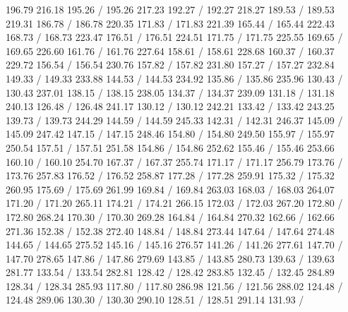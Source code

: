 { 196.79 216.18 195.26 /
 195.26 217.23 192.27 /
 192.27 218.27 189.53 /
 189.53 219.31 186.78 /
 186.78 220.35 171.83 /
 171.83 221.39 165.44 /
 165.44 222.43 168.73 /
 168.73 223.47 176.51 /
 176.51 224.51 171.75 /
 171.75 225.55 169.65 /
 169.65 226.60 161.76 /
 161.76 227.64 158.61 /
 158.61 228.68 160.37 /
 160.37 229.72 156.54 /
 156.54 230.76 157.82 /
 157.82 231.80 157.27 /
 157.27 232.84 149.33 /
 149.33 233.88 144.53 /
 144.53 234.92 135.86 /
 135.86 235.96 130.43 /
 130.43 237.01 138.15 /
 138.15 238.05 134.37 /
 134.37 239.09 131.18 /
 131.18 240.13 126.48 /
 126.48 241.17 130.12 /
 130.12 242.21 133.42 /
 133.42 243.25 139.73 /
 139.73 244.29 144.59 /
 144.59 245.33 142.31 /
 142.31 246.37 145.09 /
 145.09 247.42 147.15 /
 147.15 248.46 154.80 /
 154.80 249.50 155.97 /
 155.97 250.54 157.51 /
 157.51 251.58 154.86 /
 154.86 252.62 155.46 /
 155.46 253.66 160.10 /
 160.10 254.70 167.37 /
 167.37 255.74 171.17 /
 171.17 256.79 173.76 /
 173.76 257.83 176.52 /
 176.52 258.87 177.28 /
 177.28 259.91 175.32 /
 175.32 260.95 175.69 /
 175.69 261.99 169.84 /
 169.84 263.03 168.03 /
 168.03 264.07 171.20 /
 171.20 265.11 174.21 /
 174.21 266.15 172.03 /
 172.03 267.20 172.80 /
 172.80 268.24 170.30 /
 170.30 269.28 164.84 /
 164.84 270.32 162.66 /
 162.66 271.36 152.38 /
 152.38 272.40 148.84 /
 148.84 273.44 147.64 /
 147.64 274.48 144.65 /
 144.65 275.52 145.16 /
 145.16 276.57 141.26 /
 141.26 277.61 147.70 /
 147.70 278.65 147.86 /
 147.86 279.69 143.85 /
 143.85 280.73 139.63 /
 139.63 281.77 133.54 /
 133.54 282.81 128.42 /
 128.42 283.85 132.45 /
 132.45 284.89 128.34 /
 128.34 285.93 117.80 /
 117.80 286.98 121.56 /
 121.56 288.02 124.48 /
 124.48 289.06 130.30 /
 130.30 290.10 128.51 /
 128.51 291.14 131.93 /
}

